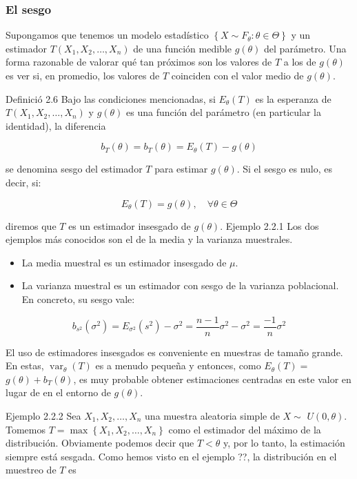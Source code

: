 \documentclass[
]{article}
\providecommand{\tightlist}{%
  \setlength{\itemsep}{0pt}\setlength{\parskip}{0pt}}
\begin{document}
\subsubsection{El sesgo}\label{el-sesgo}

Supongamos que tenemos un modelo estadístico \(\left\{X \sim F_{\theta}: \theta \in \Theta\right\}\) y un estimador \(T\left(X_{1}, X_{2}, \ldots, X_{n}\right)\) de una función medible \(g(\theta)\) del parámetro. Una forma razonable de valorar qué tan próximos son los valores de \(T\) a los de \(g(\theta)\) es ver si, en promedio, los valores de \(T\) coinciden con el valor medio de \(g(\theta)\).

Definició 2.6 Bajo las condiciones mencionadas, si \(E_{\theta}(T)\) es la esperanza de \(T\left(X_{1}, X_{2}, \ldots, X_{n}\right)\) y \(g(\theta)\) es una función del parámetro (en particular la identidad), la diferencia

\[
b_{T}(\theta)=b_{T}(\theta)=E_{\theta}(T)-g(\theta)
\]

se denomina sesgo del estimador \(T\) para estimar \(g(\theta)\). Si el sesgo es nulo, es decir, si:

\[
E_{\theta}(T)=g(\theta), \quad \forall \theta \in \Theta
\]

diremos que \(T\) es un estimador insesgado de \(g(\theta)\).
Ejemplo 2.2.1 Los dos ejemplos más conocidos son el de la media y la varianza muestrales.

\begin{itemize}
\tightlist
\item
  La media muestral es un estimador insesgado de \(\mu\).
\item
  La varianza muestral es un estimador con sesgo de la varianza poblacional. En concreto, su sesgo vale:
\end{itemize}

\[
b_{s^{2}}\left(\sigma^{2}\right)=E_{\sigma^{2}}\left(s^{2}\right)-\sigma^{2}=\frac{n-1}{n} \sigma^{2}-\sigma^{2}=\frac{-1}{n} \sigma^{2}
\]

El uso de estimadores insesgados es conveniente en muestras de tamaño grande. En estas, \(\operatorname{var}_{\theta}(T)\) es a menudo pequeña y entonces, como \(E_{\theta}(T)=\) \(g(\theta)+b_{T}(\theta)\), es muy probable obtener estimaciones centradas en este valor en lugar de en el entorno de \(g(\theta)\).

Ejemplo 2.2.2 Sea \(X_{1}, X_{2}, \ldots, X_{n}\) una muestra aleatoria simple de \(X \sim\) \(U(0, \theta)\). Tomemos \(T=\max \left\{X_{1}, X_{2}, \ldots, X_{n}\right\}\) como el estimador del máximo de la distribución. Obviamente podemos decir que \(T<\theta\) y, por lo tanto,
la estimación siempre está sesgada. Como hemos visto en el ejemplo ??, la distribución en el muestreo de \(T\) es
\end{document}
